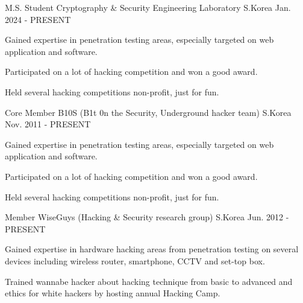 


\begin{cventries}


\cventry
{M.S. Student} %
{Cryptography \& Security Engineering Laboratory} %
{S.Korea} %
{Jan. 2024 - PRESENT} %
{ %
	\begin{cvitems}
		\item {Gained expertise in penetration testing areas, especially targeted on web application and software.}
		\item {Participated on a lot of hacking competition and won a good award.}
		\item {Held several hacking competitions non-profit, just for fun.}
	\end{cvitems}
}


\cventry
{Core Member} %
{B10S (B1t 0n the Security, Underground hacker team)} %
{S.Korea} %
{Nov. 2011 - PRESENT} %
{ %
\begin{cvitems}
\item {Gained expertise in penetration testing areas, especially targeted on web application and software.}
\item {Participated on a lot of hacking competition and won a good award.}
\item {Held several hacking competitions non-profit, just for fun.}
\end{cvitems}
}


\cventry
{Member} %
{WiseGuys (Hacking \& Security research group)} %
{S.Korea} %
{Jun. 2012 - PRESENT} %
{ %
\begin{cvitems}
\item {Gained expertise in hardware hacking areas from penetration testing on several devices including wireless router, smartphone, CCTV and set-top box.}
\item {Trained wannabe hacker about hacking technique from basic to advanced and ethics for white hackers by hosting annual Hacking Camp.}
\end{cvitems}
}


\end{cventries}
